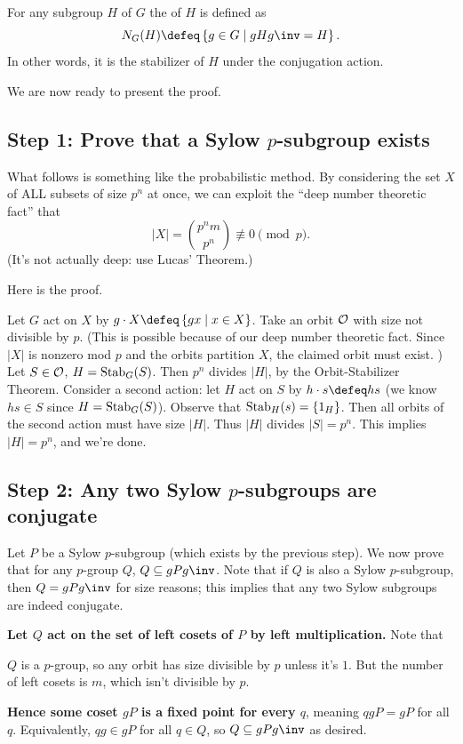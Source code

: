 \begin{definition}
	For any subgroup $H$ of $G$ the  of $H$ is defined as
	\[ N_G(H) \defeq \left\{ g \in G \mid gHg\inv = H \right\}. \]
	In other words, it is the stabilizer of $H$ under the conjugation action.
\end{definition}

We are now ready to present the proof.

\subsection*{Step 1: Prove that a Sylow $p$-subgroup exists}
What follows is something like the probabilistic method.
By considering the set $X$ of ALL subsets of size $p^n$ at once, we can exploit the ``deep number theoretic fact'' that 
\[ \left\lvert X \right\rvert = \binom{p^n m}{p^n} \not\equiv 0 \pmod p. \]
(It's not actually deep: use Lucas' Theorem.)

Here is the proof.
\begin{itemize}
	\ii Let $G$ act on $X$ by $g \cdot X \defeq \left\{ gx \mid x \in X \right\}$.
	\ii Take an orbit $\mathcal O$ with size not divisible by $p$.
	(This is possible because of our deep number theoretic fact.
	Since $\left\lvert X \right\rvert$ is nonzero mod $p$ and the orbits partition $X$, the claimed orbit must exist. )
	\ii Let $S \in \mathcal O$, $H = \operatorname{Stab}_G(S)$. Then $p^n$ divides $\left\lvert H \right\rvert$, by the Orbit-Stabilizer Theorem.
	\ii Consider a second action: let $H$ act on $S$ by 
	$h \cdot s \defeq hs$ (we know $hs \in S$ since $H = \operatorname{Stab}_G(S)$).
	\ii
	Observe that $\operatorname{Stab}_H(s) = \{1_H\}$.
	Then all orbits of the second action must have size $\left\lvert H \right\rvert$. Thus $\left\lvert H \right\rvert$ divides $\left\lvert S \right\rvert = p^n$.
	\ii This implies $\left\lvert H \right\rvert = p^n$, and we're done.
\end{itemize}


\subsection*{Step 2: Any two Sylow $p$-subgroups are conjugate}
Let $P$ be a Sylow $p$-subgroup (which exists by the previous step).
We now prove that for any $p$-group $Q$, $Q \subseteq gPg\inv$.
Note that if $Q$ is also a Sylow $p$-subgroup, then $Q = gPg\inv$ for size reasons;
this implies that any two Sylow subgroups are indeed conjugate.

\textbf{Let $Q$ act on the set of left cosets of $P$ by left multiplication.}
Note that
\begin{itemize}
	\ii $Q$ is a $p$-group, so any orbit has size divisible by $p$ unless it's $1$.
	\ii But the number of left cosets is $m$, which isn't divisible by $p$.
\end{itemize}
\textbf{Hence some coset $gP$ is a fixed point for every $q$}, meaning
$qgP = gP$ for all $q$.
Equivalently, $qg \in gP$ for all $q \in Q$, so $Q \subseteq gPg\inv$ as desired.


